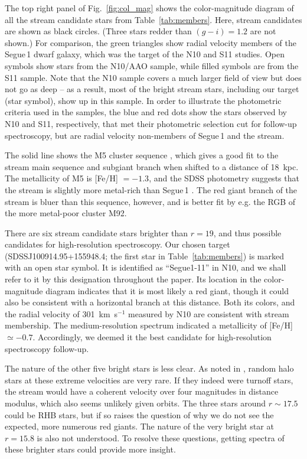 \documentclass{emulateapj}
\begin{document}
The top right panel of Fig.~\ref{fig:col_mag} shows the color-magnitude diagram of all the stream candidate stars from Table~\ref{tab:members}. Here, stream candidates are shown as black circles. (Three stars redder than $(g-i) = 1.2 $ are not shown.) For comparison, the green triangles show radial velocity members of the Segue\,1 dwarf galaxy, which was the target of the N10 and S11 studies. Open symbols show stars from the N10/AAO sample, while filled symbols are from the S11 sample. Note that the N10 sample covers a much larger field of view but does not go as deep -- as a result, most of the bright stream stars, including our target (star symbol), show up in this sample. In order to illustrate the photometric criteria used in the samples, the blue and red dots show the stars observed by N10 and S11, respectively, that met their photometric selection cut for follow-up spectroscopy, but are radial velocity non-members of Segue\,1 and the stream.

The solid line shows the M5 cluster sequence \citep{An2008}, which gives a good fit to the stream main sequence and subgiant branch when shifted to a distance of 18~kpc. The metallicity of M5 is [Fe/H] $= -1.3$, and the SDSS photometry suggests that the stream is slightly more metal-rich than Segue\,1 \citep{Simon2011}. The red giant branch of the stream is bluer than this sequence, however, and is better fit by e.g. the RGB of the more metal-poor cluster M92.

There are six stream candidate stars brighter than $r = 19$, and thus possible candidates for high-resolution spectroscopy. Our chosen target (SDSSJ100914.95+155948.4; the first star in Table~\ref{tab:members}) is marked with an open star symbol. It is identified as ``Segue1-11'' in N10, and we shall refer to it by this designation throughout the paper. Its location in the color-magnitude diagram indicates that it is most likely a red giant, though it could also be consistent with a horizontal branch at this distance. Both its colors, and the radial velocity of 301~km~s$^{-1}$ measured by N10 are consistent with stream membership. The medium-resolution spectrum indicated a metallicity of [Fe/H]$\simeq -0.7$. Accordingly, we deemed it the best candidate for high-resolution spectroscopy follow-up. 

The nature of the other five bright stars is less clear. As noted in \citet{Geha2009}, random halo stars at these extreme velocities are very rare. If they indeed were turnoff stars, the stream would have a coherent velocity over four magnitudes in distance modulus, which also seems unlikely given orbits. The three stars around $r\sim 17.5$ could be RHB stars, but if so raises the question of why we do not see the expected, more numerous red giants. The nature of the very bright star at $r = 15.8$ is also not understood. To resolve these questions, getting spectra of these brighter stars could provide more insight. 
\end{document}
